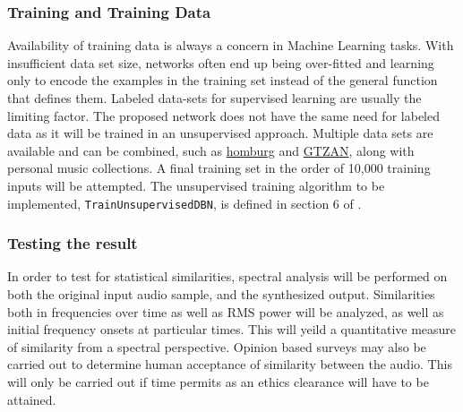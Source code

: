 \documentclass[12pt]{article}
\begin{document}
\subsubsection{Training and Training Data}
Availability of training data is always a concern in Machine Learning tasks. With insufficient data set size, networks often end up being over-fitted and learning only to encode the examples in the training set instead of the general function that defines them. Labeled data-sets for supervised learning are usually the limiting factor. The proposed network does not have the same need for labeled data as it will be trained in an unsupervised approach. Multiple data sets are available and can be combined, such as \href{http://www-ai.cs.uni-dortmund.de/audio.html}{homburg} and \href{http://marsyas.info/downloads/datasets.html}{GTZAN}, along with personal music collections. A final training set in the order of 10,000 training inputs will be attempted. The unsupervised training algorithm to be implemented, \texttt{TrainUnsupervisedDBN}, is defined in section 6 of \citet{bengio2009learning}.

\subsubsection{Testing the result}
In order to test for statistical similarities, spectral analysis will be performed on both the original input audio sample, and the synthesized output. Similarities both in frequencies over time as well as RMS power will be analyzed, as well as initial frequency onsets at particular times. This will yeild a quantitative measure of similarity from a spectral perspective. Opinion based surveys may also be carried out to determine human acceptance of similarity between the audio. This will only be carried out if time permits as an ethics clearance will have to be attained.
\end{document}
